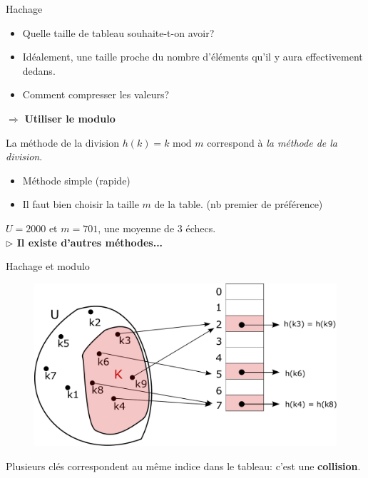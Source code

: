 \documentclass[12pt,a4paper]{beamer}
\begin{document}
\begin{frame}{Hachage}
\begin{itemize}
\item Quelle taille de tableau souhaite-t-on avoir?
\pause
\item Idéalement, une taille proche du nombre d'éléments qu'il y aura effectivement dedans. \pause
\item Comment compresser les valeurs?\pause
\end{itemize}

$\Rightarrow$ \textbf{Utiliser le modulo}
\end{frame}

\begin{frame}{La méthode de la division}
$h(k) =  k \text{ mod } m$ correspond à \textit{la méthode de la division}.
\begin{itemize}
\item  Méthode simple (rapide)
\item Il faut bien choisir la taille $m$ de la table. (nb premier de préférence)
\end{itemize}
$U=2000$ et $m=701$, une moyenne de 3 échecs.\\
\vspace{1.5em}
\textbf{$\triangleright$ Il existe d'autres méthodes...}

\end{frame}




\begin{frame}{Hachage et modulo}

\begin{figure}
\includegraphics[scale=0.28]{figs/ht_cle_unseq_col}
\end{figure}
\pause
\begin{block}{}
Plusieurs clés correspondent au même indice dans le tableau: c'est une \textbf{collision}.
\end{block}

\end{frame}
\end{document}

